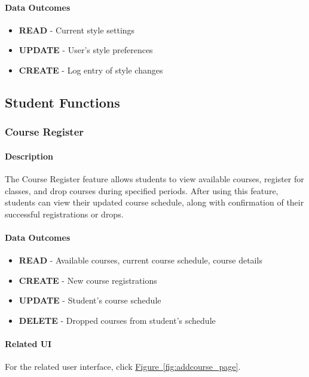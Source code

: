 \documentclass[12pt]{article}
\begin{document}
\paragraph{Data Outcomes}
\begin{itemize}
    \item \textbf{READ} - Current style settings
    \item \textbf{UPDATE} - User's style preferences
    \item \textbf{CREATE} - Log entry of style changes
\end{itemize}

\subsection{Student Functions}
\subsubsection{Course Register}

\paragraph{Description}
The Course Register feature allows students to view available courses, register for classes, and drop courses during specified periods. After using this feature, students can view their updated course schedule, along with confirmation of their successful registrations or drops.

\paragraph{Data Outcomes}
\begin{itemize}
    \item \textbf{READ} - Available courses, current course schedule, course details
    \item \textbf{CREATE} - New course registrations
    \item \textbf{UPDATE} - Student's course schedule
    \item \textbf{DELETE} - Dropped courses from student's schedule
\end{itemize}

\paragraph{Related UI}
For the related user interface, click \hyperref[fig:addcourse_page]{Figure~\ref*{fig:addcourse_page}}.
\end{document}
